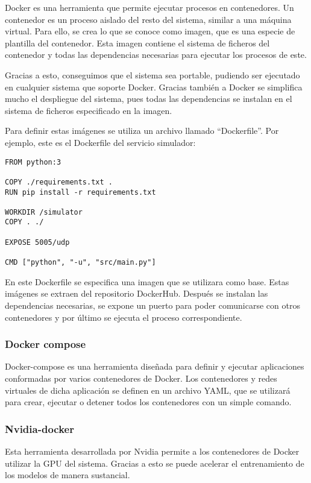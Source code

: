 Docker \cite{docker-pag} es una herramienta que permite ejecutar procesos en contenedores. Un contenedor es un proceso aislado del 
resto del sistema, similar a una máquina virtual. Para ello, se crea lo que se conoce como imagen, que es una especie 
de plantilla del contenedor. Esta imagen contiene el sistema de ficheros del contenedor y todas las dependencias 
necesarias para ejecutar los procesos de este.

Gracias a esto, conseguimos que el sistema sea portable, pudiendo ser ejecutado en cualquier sistema que soporte 
Docker. Gracias también a Docker se simplifica mucho el despliegue del sistema, pues todas las dependencias 
se instalan en el sistema de ficheros especificado en la imagen.

Para definir estas imágenes se utiliza un archivo llamado ``Dockerfile''. Por ejemplo, este es el Dockerfile del 
servicio simulador:
\begin{lstlisting}
FROM python:3

COPY ./requirements.txt .
RUN pip install -r requirements.txt

WORKDIR /simulator
COPY . ./

EXPOSE 5005/udp

CMD ["python", "-u", "src/main.py"]
\end{lstlisting}

En este Dockerfile se especifica una imagen que se utilizara como base. Estas imágenes se extraen del repositorio 
DockerHub. Después se instalan las dependencias necesarias, se expone un puerto para poder comunicarse con otros 
contenedores y por último se ejecuta el proceso correspondiente.

\subsubsection{Docker compose}

Docker-compose \cite{compose} es una herramienta diseñada para definir y ejecutar aplicaciones conformadas por varios contenedores
de Docker. Los contenedores y redes virtuales de dicha aplicación se definen en un archivo YAML, que se utilizará 
para crear, ejecutar o detener todos los contenedores con un simple comando.

\subsubsection{Nvidia-docker}

Esta herramienta \cite{nvidia-docker} desarrollada por Nvidia permite a los contenedores de Docker utilizar la GPU del sistema. Gracias
a esto se puede acelerar el entrenamiento de los modelos de manera sustancial.

